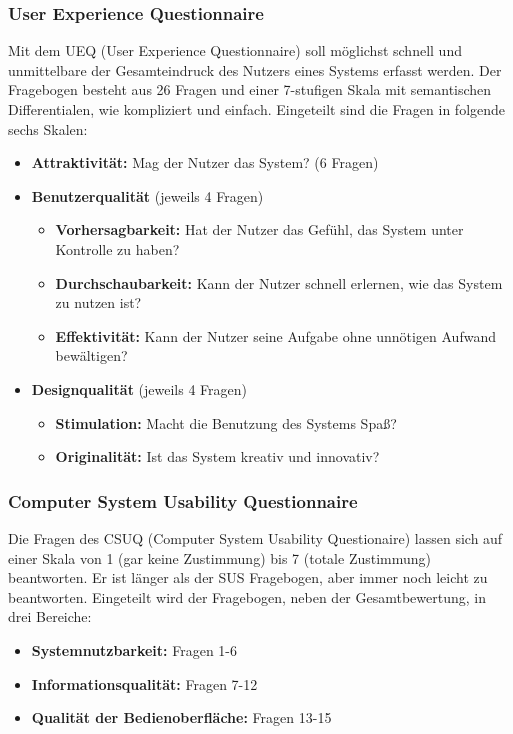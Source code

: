 \subsubsection*{User Experience Questionnaire}
Mit dem UEQ (User Experience Questionnaire) soll möglichst schnell und unmittelbare der Gesamteindruck des Nutzers eines Systems erfasst werden. Der Fragebogen besteht aus 26 Fragen und einer 7-stufigen Skala mit semantischen Differentialen, wie kompliziert und einfach. Eingeteilt sind die Fragen in folgende sechs Skalen:
\begin{itemize}
\item \textbf{Attraktivität:} Mag der Nutzer das System? (6 Fragen)
\item \textbf{Benutzerqualität} (jeweils 4 Fragen)
	\begin{itemize}
	\item \textbf{Vorhersagbarkeit:} Hat der Nutzer das Gefühl, das System unter Kontrolle zu haben?
	\item \textbf{Durchschaubarkeit:} Kann der Nutzer schnell erlernen, wie das System zu nutzen ist?
	\item \textbf{Effektivität:} Kann der Nutzer seine Aufgabe ohne unnötigen Aufwand bewältigen?
	\end{itemize}
\item \textbf{Designqualität} (jeweils 4 Fragen)
	\begin{itemize}
	\item \textbf{Stimulation:} Macht die Benutzung des Systems Spaß?
	\item \textbf{Originalität:} Ist das System kreativ und innovativ?
	\end{itemize}
\end{itemize}

\subsubsection*{Computer System Usability Questionnaire}
Die Fragen des CSUQ (Computer System Usability Questionaire) lassen sich auf einer Skala von 1 (gar keine Zustimmung) bis 7 (totale Zustimmung) beantworten. Er ist länger als der SUS Fragebogen, aber immer noch leicht zu beantworten. Eingeteilt wird der Fragebogen, neben der Gesamtbewertung, in drei Bereiche: 
\begin{itemize}
\item \textbf{Systemnutzbarkeit:} Fragen 1-6
\item \textbf{Informationsqualität:} Fragen 7-12
\item \textbf{Qualität der Bedienoberfläche:} Fragen 13-15
\end{itemize}


